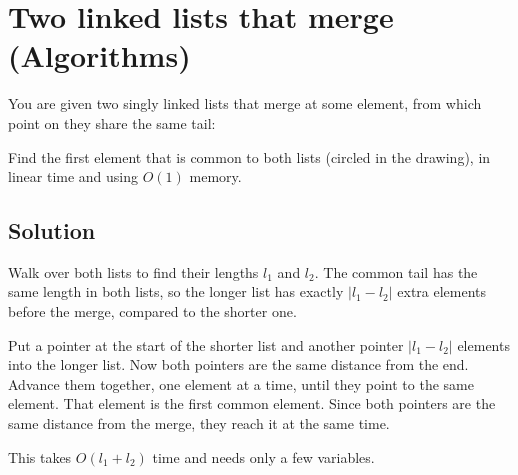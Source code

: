 \section {Two linked lists that merge (Algorithms)}

You are given two singly linked lists that merge at some element, from which point on they share the same tail:

\begin{center}
\end{center}

Find the first element that is common to both lists (circled in the drawing), in linear time and using $O(1)$ memory.

\subsection{Solution}

Walk over both lists to find their lengths $l_1$ and $l_2$. The common tail has the same length in both lists,
so the longer list has exactly $|l_1 - l_2|$ extra elements before the merge, compared to the shorter one.

Put a pointer at the start of the shorter list and another pointer $|l_1 - l_2|$ elements into the longer list.
Now both pointers are the same distance from the end. Advance them together, one element at a time, until they point to the same element.
That element is the first common element.
Since both pointers are the same distance from the merge, they reach it at the same time.

This takes $O(l_1 + l_2)$ time and needs only a few variables.
